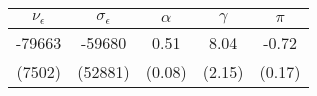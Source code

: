 \begin{tabular}{ccccc}\toprule$\nu_{\epsilon}$ & $\sigma_{\epsilon}$ & $\alpha$ & $\gamma$ & $\pi$ \\ \midrule -79663 &  -59680 & 0.51 &  8.04 & -0.72 \\(7502) & (52881) & (0.08) & (2.15) & (0.17)\\\bottomrule\end{tabular}